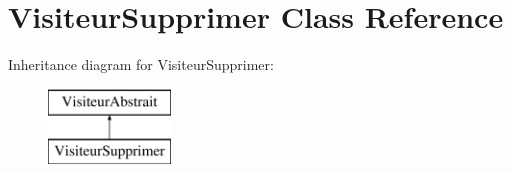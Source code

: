 \hypertarget{class_visiteur_supprimer}{}\section{Visiteur\+Supprimer Class Reference}
\label{class_visiteur_supprimer}
Inheritance diagram for Visiteur\+Supprimer\+:\begin{figure}[H]
\begin{center}
\leavevmode
\includegraphics[height=2.000000cm]{class_visiteur_supprimer}
\end{center}
\end{figure}
